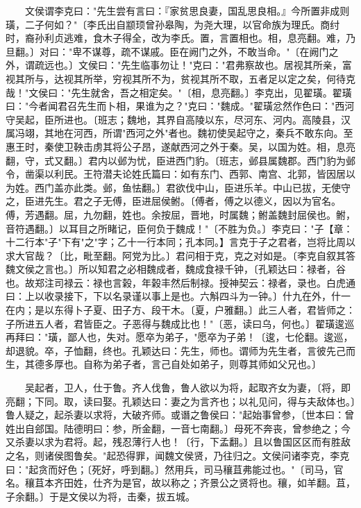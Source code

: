 　　文侯谓李克曰："先生尝有言曰：『家贫思良妻，国乱思良相。』今所置非成则璜，二子何如？"〔李氏出自颛顼曾孙皋陶，为尧大理，以官命族为理氏。商纣时，裔孙利贞逃难，食木子得全，改为李氏。置，言置相也。相，息亮翻。难，乃旦翻。〕对曰："卑不谋尊，疏不谋戚。臣在阙门之外，不敢当命。"〔在阙门之外，谓疏远也。〕文侯曰："先生临事勿让！"克曰："君弗察故也。居视其所亲，富视其所与，达视其所举，穷视其所不为，贫视其所不取，五者足以定之矣，何待克哉！"文侯曰："先生就舍，吾之相定矣。"〔相，息亮翻。〕李克出，见翟璜。翟璜曰："今者闻君召先生而卜相，果谁为之？"克曰："魏成。"翟璜忿然作色曰："西河守吴起，臣所进也。〔班志；魏地，其界自高陵以东，尽河东、河内。高陵县，汉属冯翊，其地在河西，所谓"西河之外"者也。魏初使吴起守之，秦兵不敢东向。至惠王时，秦使卫鞅击虏其将公子昂，遂献西河之外于秦。吴，以国为姓。相，息亮翻，守，式又翻。〕君内以邺为忧，臣进西门豹。〔班志，邺县属魏郡。西门豹为邺令，凿渠以利民。王符潜夫论姓氏篇曰：如有东门、西郭、南宫、北郭，皆因居以为姓。西门盖亦此类。邺，鱼怯翻。〕君欲伐中山，臣进乐羊。中山已拔，无使守之，臣进先生。君之子无傅，臣进屈侯鲋。〔傅者，傅之以德义，因以为官名。傅，芳遇翻。屈，九勿翻，姓也。余按屈，晋地，时属魏；鲋盖魏封屈侯也。鲋，音符遇翻。〕以耳目之所睹记，臣何负于魏成！"〔不胜为负。〕李克曰："子【章：十二行本"子"下有"之"字；乙十一行本同；孔本同。】言克于子之君者，岂将比周以求大官哉？〔比，毗至翻。阿党为比。〕君问相于克，克之对如是。〔李克自叙其答魏文侯之言也。〕所以知君之必相魏成者，魏成食禄千钟，〔孔颖达曰：禄者，谷也。故郑注司禄云：禄也言榖，年榖丰然后制禄。授神契云：禄者，录也。白虎通曰：上以收录接下，下以名录谨以事上是也。六斛四斗为一钟。〕什九在外，什一在内；是以东得卜子夏、田子方、段干木。〔夏，户雅翻。〕此三人者，君皆师之：子所进五人者，君皆臣之。子恶得与魏成比也！"〔恶，读曰乌，何也。〕翟璜逡巡再拜曰："璜，鄙人也，失对。愿卒为弟子，"愿卒为子弟！〔逡，七伦翻。逡巡，却退貌。卒，子恤翻，终也。孔颖达曰：先生，师也。谓师为先生者，言彼先己而生，其德多厚也。自称为弟子者，言己自处如弟子，则尊其师如父兄也。〕

　　吴起者，卫人，仕于鲁。齐人伐鲁，鲁人欲以为将，起取齐女为妻，〔将，即亮翻；下同。取，读曰娶。孔颖达曰：妻之为言齐也；以礼见问，得与夫敌体也。〕鲁人疑之，起杀妻以求将，大破齐师。或谮之鲁侯曰："起始事曾参，〔世本曰：曾姓出自郐国。陆德明曰：参，所金翻，一音七南翻。〕母死不奔丧，曾参绝之；今又杀妻以求为君将。起，残忍薄行人也！〔行，下孟翻。〕且以鲁国区区而有胜敌之名，则诸侯图鲁矣。"起恐得罪，闻魏文侯贤，乃往归之。文侯问诸李克，李克曰："起贪而好色；〔死好，呼到翻。〕然用兵，司马穰苴弗能过也。"〔司马，官名。穰苴本齐田姓，仕齐为是官，故以称之；齐景公之贤将也。穰，如羊翻。苴，子余翻。〕于是文侯以为将，击秦，拔五城。

